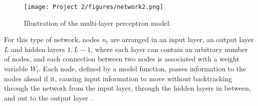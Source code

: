 \documentclass[english,notitlepage,reprint,nofootinbib]{revtex4-2}  %
\begin{document}
\begin{figure}[h!]
    \centering %
    \texttt{[image: Project 2/figures/network2.png]} 
    \caption{Illustration of the multi-layer perceptron model.}
    \label{fig: Multi Layer Perceptron Model}
\end{figure}

For this type of network, nodes $n_l$ are arranged in an input layer, an output layer $L$ and hidden layers $1,L-1$, where each layer can contain an arbitrary number of nodes, and each connection between two nodes is associated with a weight variable $W_l$. 
Each node, defined by a model function, passes information to the nodes ahead if it, causing input information to move without backtracking through the network from the input layer, through the hidden layers in between, and out to the output layer~\cite{friedman}. 
\end{document}
